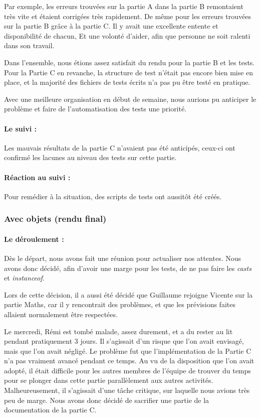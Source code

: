 \documentclass[a4paper, 12pt]{article}
\newcommand{\nom}[1]{\emph{#1}}
\begin{document}
Par exemple, les erreurs trouvées sur la partie A dans la partie B
remontaient très vite et étaient corrigées très rapidement. De même
pour les erreurs trouvées sur la partie B grâce à la partie C. Il y
avait une excellente entente et disponibilité de chacun, Et une
volonté d'aider, afin que personne ne soit ralenti dans son travail.

Dans l'ensemble, nous étions assez satisfait du rendu pour la partie B
et les tests.  Pour la Partie C en revanche, la structure de test
n'était pas encore bien mise en place, et la majorité des fichiers de
tests écrits n'a pas pu être testé en pratique.

Avec une meilleure organisation en début de semaine, nous aurions pu
anticiper le problème et faire de l'automatisation des tests une
priorité.

\paragraph*{Le suivi :}
Les mauvais résultats de la partie C n'avaient pas été anticipés,
ceux-ci ont confirmé les lacunes au niveau des tests sur cette partie.

\paragraph*{Réaction au suivi :}
Pour remédier à la situation, des scripts de tests ont aussitôt été
créés.

\subsubsection{Avec objets (rendu final)}

\paragraph*{Le déroulement :}
Dès le départ, nous avons fait une réunion pour actualiser nos
attentes. Nous avons donc décidé, afin d'avoir une marge pour les
tests, de ne pas faire les \nom{casts} et \nom{instanceof}.

Lors de cette décision, il a aussi été décidé que Guillaume rejoigne
Vicente sur la partie Maths, car il y rencontrait des problèmes, et
que les prévisions faites allaient normalement être respectées.

Le mercredi, Rémi est tombé malade, assez durement, et a du rester au
lit pendant pratiquement 3 jours. Il s'agissait d'un risque que l'on
avait envisagé, mais que l'on avait négligé. Le problème fut que
l'implémentation de la Partie C n'a pas vraiment avancé pendant ce
temps.  Au vu de la disposition que l'on avait adopté, il était
difficile pour les autres membres de l'équipe de trouver du temps pour
se plonger dans cette partie parallèlement aux autres
activités. Malheureusement, il s'agissait d'une tâche critique, sur
laquelle nous avions très peu de marge. Nous avons donc décidé de
sacrifier une partie de la documentation de la partie C.
\end{document}
